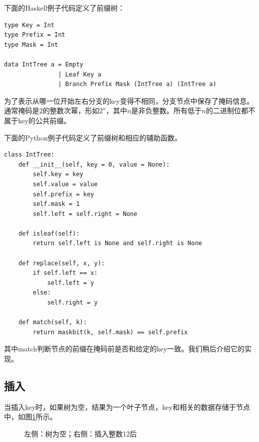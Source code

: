 \documentclass[b5paper]{ctexart}
\begin{document}
下面的Haskell例子代码定义了前缀树：

\lstset{language=Haskell}
\begin{lstlisting}[style=Haskell]
type Key = Int
type Prefix = Int
type Mask = Int

data IntTree a = Empty
               | Leaf Key a
               | Branch Prefix Mask (IntTree a) (IntTree a)
\end{lstlisting}

为了表示从哪一位开始左右分支的key变得不相同，分支节点中保存了掩码信息。通常掩码是2的整数次幂，形如$2^n$，其中$n$是非负整数。所有低于$n$的二进制位都不属于key的公共前缀。

下面的Python例子代码定义了前缀树和相应的辅助函数。

\lstset{language=Python}
\begin{lstlisting}
class IntTree:
    def __init__(self, key = 0, value = None):
        self.key = key
        self.value = value
        self.prefix = key
        self.mask = 1
        self.left = self.right = None

    def isleaf(self):
        return self.left is None and self.right is None

    def replace(self, x, y):
        if self.left == x:
            self.left = y
        else:
            self.right = y

    def match(self, k):
        return maskbit(k, self.mask) == self.prefix
\end{lstlisting}

其中match判断节点的前缀在掩码前是否和给定的key一致。我们稍后介绍它的实现。

\subsection{插入}
当插入key时，如果树为空，结果为一个叶子节点，key和相关的数据存储于节点中，如图\ref{fig:int-patricia-insert-a}所示。

\begin{figure}[htbp]
  \centering
  \caption{左侧：树为空；右侧：插入整数12后}
  \label{fig:int-patricia-insert-a}
\end{figure}
\end{document}
